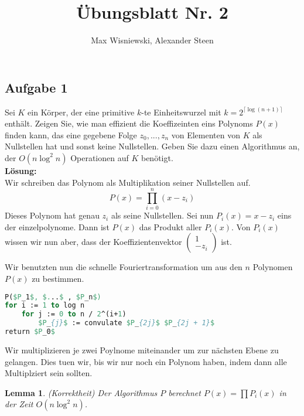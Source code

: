 \documentclass[11pt,a4paper,ngerman]{article}
\date{}
\title{Übungsblatt Nr. 2}
\author{Max Wisniewski, Alexander Steen}
\newtheorem{lemma}{\bfseries Lemma}
\begin{document}
\renewcommand{\figurename}{Figure}
\maketitle
\thispagestyle{fancy}

\subsection*{Aufgabe 1}

Sei $K$ ein Körper, der eine primitive $k$-te Einheitswurzel mit $k=2^{\lceil \log (n+1) \rceil}$ enthält. Zeigen Sie, wie man effizient die Koeffizeinten eins Polynoms $P(x)$ finden kann, das eine gegebene Folge $z_0,...,z_n$ von Elementen von $K$ als Nullstellen hat und sonst keine Nullstellen. Geben Sie dazu einen Algorithmus an, der $O(n\log^2 n)$ Operationen auf $K$ benötigt.\\

\textbf{Lösung:}\\

Wir schreiben das Polynom als Multiplikation seiner Nullstellen auf.
\begin{equation}
    P(x) = \underset{i=0}{\overset{n}{\prod}} (x-z_i)
\end{equation}
Dieses Polynom hat genau $z_i$ als seine Nullstellen. Sei nun
$P_{i}(x) = x-z_i$ eins der einzelpolynome. Dann ist $P(x)$ das Produkt aller $P_i(x)$.
Von $P_i(x)$ wissen wir nun aber, dass der Koeffizientenvektor $\left( \begin{array}{c}1\\-z_i\end{array}\right)$ ist.

Wir benutzten nun die schnelle Fouriertransformation um aus den $n$ Polynomen $P(x)$ zu bestimmen.

\begin{lstlisting}[language=Pascal, mathescape=true]
P($P_1$, $...$ , $P_n$)
for i := 1 to log n
    for j := 0 to n / 2^(i+1)
        $P_{j}$ := convulate $P_{2j}$ $P_{2j + 1}$
return $P_0$
\end{lstlisting}

Wir multiplizieren je zwei Poylnome miteinander um zur nächsten Ebene zu gelangen. Dies tuen wir, bis wir nur noch ein Polynom
haben, indem dann alle Multiplziert sein sollten.

\begin{lemma}\label{ha2:ueb3:poly} (Korrektheit)
    Der Algorithmus $P$ berechnet $P(x) = \prod P_i(x)$ in der Zeit $O(n \log^2 n)$.
\end{lemma}
\end{document}
